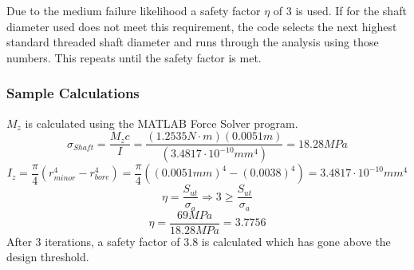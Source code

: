 \documentclass[../main.tex]{subfiles}
\begin{document}
Due to the medium failure likelihood a safety factor $\eta$ of 3 is used. If for the shaft diameter used does not meet this requirement, the code selects the next highest standard threaded shaft diameter and runs through the analysis using those numbers. This repeats until the safety factor is met. 

\subsubsection*{Sample Calculations}
$M_z$ is calculated using the MATLAB Force Solver program.
$$\sigma _{Shaft}  = \dfrac{M_{z}c}{I} = \dfrac{(1.2535N\cdot{}m)(0.0051m)}{(3.4817\cdot{}10^{-10}mm^4)}=18.28MPa$$
$$I _{z}  = \dfrac{\pi}{4} (r_{minor}^4 - r_{bore}^4) = \dfrac{\pi}{4} ((0.0051mm)^4 - (0.0038)^4) = 3.4817\cdot{}10^{-10}mm^4$$
$$\eta = \dfrac{S_{ut}}{\sigma _a} \Rightarrow 3 \geq \dfrac{S_{ut}}{\sigma _a}$$
$$\eta = \dfrac{69MPa}{18.28MPa}=3.7756$$
After 3 iterations, a safety factor of 3.8 is calculated which has gone above the design threshold.
\end{document}
